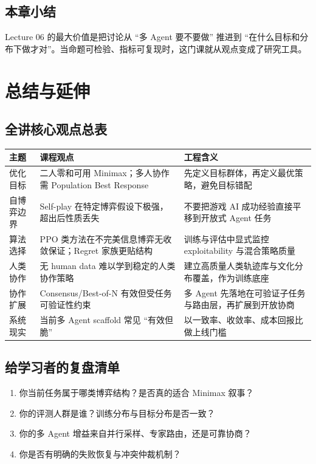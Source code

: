 \documentclass[a4paper]{article}
\begin{document}
\subsection{本章小结}
Lecture 06 的最大价值是把讨论从 ``多 Agent 要不要做'' 推进到 ``在什么目标和分布下做才对''。当命题可检验、指标可复现时，这门课就从观点变成了研究工具。

\section{总结与延伸}

\subsection{全讲核心观点总表}
\begin{longtable}{p{2.8cm}p{4.7cm}p{5.8cm}}
\toprule
\textbf{主题} & \textbf{课程观点} & \textbf{工程含义} \\
\midrule
优化目标 & 二人零和可用 Minimax；多人协作需 Population Best Response & 先定义目标群体，再定义最优策略，避免目标错配 \\
自博弈边界 & Self-play 在特定博弈假设下极强，超出后性质丢失 & 不要把游戏 AI 成功经验直接平移到开放式 Agent 任务 \\
算法选择 & PPO 类方法在不完美信息博弈无收敛保证；Regret 家族更贴结构 & 训练与评估中显式监控 exploitability 与混合策略质量 \\
人类协作 & 无 human data 难以学到稳定的人类协作策略 & 建立高质量人类轨迹库与文化分布覆盖，作为训练底座 \\
协作扩展 & Consensus/Best-of-N 有效但受任务可验证性约束 & 多 Agent 先落地在可验证子任务与路由层，再扩展到开放协商 \\
系统现实 & 当前多 Agent scaffold 常见 ``有效但脆'' & 以一致率、收敛率、成本回报比做上线门槛 \\
\bottomrule
\end{longtable}

\subsection{给学习者的复盘清单}
\begin{enumerate}
    \item 你当前任务属于哪类博弈结构？是否真的适合 Minimax 叙事？
    \item 你的评测人群是谁？训练分布与目标分布是否一致？
    \item 你的多 Agent 增益来自并行采样、专家路由，还是可靠协商？
    \item 你是否有明确的失败恢复与冲突仲裁机制？
\end{enumerate}
\end{document}
